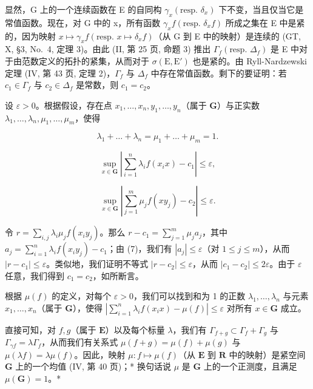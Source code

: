 显然，G 上的一个连续函数在 E 的自同构 \(\gamma_{x}(\text{resp. } \delta_{x})\) 下不变，当且仅当它是常值函数。现在，对 G 中的 x，所有函数 \(\gamma_{x}f(\text{resp. } \delta_{x}f)\) 所成之集在 E 中是紧的，因为映射 \(x \mapsto \gamma_{x}f(\text{resp. } x \mapsto \delta_{x}f)\)（从 G 到 E 中的映射）是连续的 (GT, X, §3, No.~4, 定理 3)。由此 (II, 第 25 页, 命题 3) 推出 \(\Gamma_{f}(\text{resp. } \Delta_{f})\) 是 E 中对于由范数定义的拓扑的紧集，从而对于 \(\sigma(\text{E}, \text{E}')\) 也是紧的。由 Ryll-Nardzewski 定理 (IV, 第 43 页, 定理 2)，\(\Gamma_{f}\) 与 \(\Delta_{f}\) 中存在常值函数。剩下的要证明：若 \(c_{1} \in \Gamma_{f}\) 与 \(c_{2} \in \Delta_{f}\) 是常数，则 \(c_{1} = c_{2}\)。

设 \(\varepsilon > 0\)。根据假设，存在点 \(x_{1}, \ldots, x_{n}, y_{1}, \ldots, y_{n}\)（属于 \(\mathbf{G}\)）与正实数 \(\lambda_{1}, \ldots, \lambda_{n}, \mu_{1}, \ldots, \mu_{m}\)，使得

\[
\lambda_ {1} + \dots + \lambda_ {n} = \mu_ {1} + \dots + \mu_ {m} = 1.\tag{6}
\]

\[
\sup _ {x \in \mathbf {G}} \left| \sum_ {i = 1} ^ {n} \lambda_ {i} f (x _ {i} x) - c _ {1} \right| \leqslant \varepsilon ,\tag{7}
\]

\[
\sup _ {x \in \mathbf {G}} \left| \sum_ {j = 1} ^ {m} \mu_ {j} f (x y _ {j}) - c _ {2} \right| \leqslant \varepsilon .\tag{8}
\]

令 \(r = \sum_{i,j} \lambda_i \mu_j f(x_i y_j)\)。那么 \(r - c_1 = \sum_{j=1}^{m} \mu_j a_j\)，其中 \(a_j = \sum_{i=1}^{n} \lambda_i f(x_i y_j) - c_1\)；由 (7)，我们有 \(|a_j| \leqslant \varepsilon\)（对 \(1 \leqslant j \leqslant m\)），从而 \(|r - c_1| \leqslant \varepsilon\)。类似地，我们证明不等式 \(|r - c_2| \leqslant \varepsilon\)，从而 \(|c_1 - c_2| \leqslant 2\varepsilon\)。由于 \(\varepsilon\) 任意，我们得到 \(c_1 = c_2\)，如所断言。

根据 \(\mu(f)\) 的定义，对每个 \(\varepsilon > 0\)，我们可以找到和为 1 的正数 \(\lambda_1, \ldots, \lambda_n\) 与元素 \(x_1, \ldots, x_n\)（属于 \(\mathbf{G}\)），使得 \(\left|\sum_{i=1}^{n} \lambda_i f(x_i x) - \mu(f)\right| \leqslant \varepsilon\) 对所有 \(x \in \mathbf{G}\) 成立。

直接可知，对 \(f, g\)（属于 \(\mathbf{E}\)）以及每个标量 \(\lambda\)，我们有 \(\Gamma_{f + g} \subset \Gamma_f + \Gamma_g\) 与 \(\Gamma_{\gamma f} = \lambda \Gamma_f\)，从而我们有关系式 \(\mu(f + g) = \mu(f) + \mu(g)\) 与 \(\mu(\lambda f) = \lambda \mu(f)\)。因此，映射 \(\mu : f \mapsto \mu(f)\)（从 \(\mathbf{E}\) 到 \(\mathbf{R}\) 中的映射）是紧空间 \(\mathbf{G}\) 上的一个均值 (IV, 第 40 页)；* 换句话说 \(\mu\) 是 \(\mathbf{G}\) 上的一个正测度，且满足 \(\mu(\mathbf{G}) = 1\)。*

